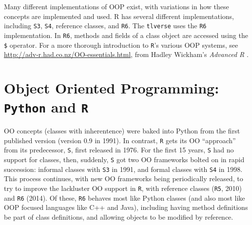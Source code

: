 \documentclass[
  12pt, krantz2,
]{krantz}
\newcommand{\passthrough}[1]{#1}
\theoremstyle{definition}
\theoremstyle{definition}
\theoremstyle{definition}
\newcommand{\1}{\mathbbm{1}}
\begin{document}
Many different implementations of OOP exist, with variations in how these
concepts are implemented and used. R has several different implementations,
including \passthrough{\lstinline!S3!}, \passthrough{\lstinline!S4!}, reference classes, and \passthrough{\lstinline!R6!}. The \passthrough{\lstinline!tlverse!} uses the \passthrough{\lstinline!R6!}
implementation. In \passthrough{\lstinline!R6!}, methods and fields of a class object are accessed using
the \passthrough{\lstinline!$!} operator. For a more thorough introduction to \passthrough{\lstinline!R!}'s various OOP systems,
see \url{http://adv-r.had.co.nz/OO-essentials.html}, from Hadley Wickham's \emph{Advanced
R} \citep{wickham2014advanced}.

\hypertarget{object-oriented-programming-python-and-r}{%
\section{\texorpdfstring{Object Oriented Programming: \texttt{Python} and \texttt{R}}{Object Oriented Programming: Python and R}}\label{object-oriented-programming-python-and-r}}

OO concepts (classes with inherentence) were baked into Python from the first
published version (version 0.9 in 1991). In contrast, \passthrough{\lstinline!R!} gets its OO ``approach''
from its predecessor, \passthrough{\lstinline!S!}, first released in 1976. For the first 15 years, \passthrough{\lstinline!S!}
had no support for classes, then, suddenly, \passthrough{\lstinline!S!} got two OO frameworks bolted on
in rapid succession: informal classes with \passthrough{\lstinline!S3!} in 1991, and formal classes with
\passthrough{\lstinline!S4!} in 1998. This process continues, with new OO frameworks being periodically
released, to try to improve the lackluster OO support in \passthrough{\lstinline!R!}, with reference
classes (\passthrough{\lstinline!R5!}, 2010) and \passthrough{\lstinline!R6!} (2014). Of these, \passthrough{\lstinline!R6!} behaves most like Python
classes (and also most like OOP focused languages like C++ and Java), including
having method definitions be part of class definitions, and allowing objects to
be modified by reference.

  

\backmatter
\printindex
\end{document}
